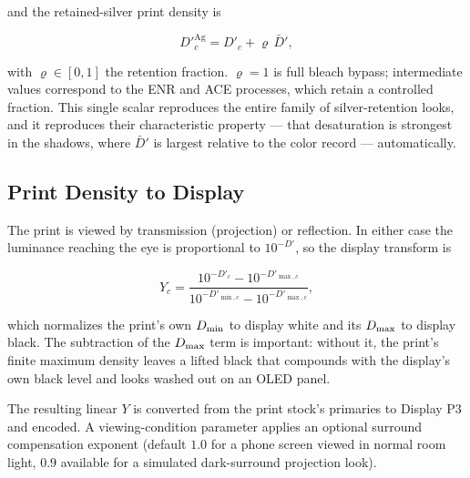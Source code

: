 and the retained-silver print density is

\begin{equation}
D'^{\mathrm{Ag}}_c = D'_c + \varrho\, \bar{D}',
\label{eq:silverretention}
\end{equation}

with $\varrho \in [0, 1]$ the retention fraction. $\varrho = 1$ is full bleach
bypass; intermediate values correspond to the ENR and ACE processes, which
retain a controlled fraction. This single scalar reproduces the entire family
of silver-retention looks, and it reproduces their characteristic property ---
that desaturation is strongest in the shadows, where $\bar{D}'$ is largest
relative to the color record --- automatically.

\subsection{Print Density to Display}

The print is viewed by transmission (projection) or reflection. In either case
the luminance reaching the eye is proportional to $10^{-D'}$, so the display
transform is

\begin{equation}
Y_c = \frac{10^{-D'_c} - 10^{-D'_{\max,c}}}{10^{-D'_{\min,c}} - 10^{-D'_{\max,c}}},
\label{eq:printtodisplay}
\end{equation}

which normalizes the print's own $D_{\min}$ to display white and its $D_{\max}$ to
display black. The subtraction of the $D_{\max}$ term is important: without it, the
print's finite maximum density leaves a lifted black that compounds with the
display's own black level and looks washed out on an OLED panel.

The resulting linear $Y$ is converted from the print stock's primaries to
Display P3 and encoded. A viewing-condition parameter applies an optional
surround compensation exponent \cite{fairchild2013} (default $1.0$ for a phone
screen viewed in
normal room light, $0.9$ available for a simulated dark-surround projection
look).
